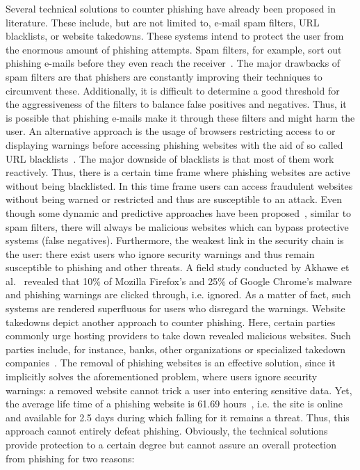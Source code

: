 Several technical solutions to counter phishing have already been proposed in literature.
These include, but are not limited to, e-mail spam filters, URL blacklists, or website takedowns.
These systems intend to protect the user from the enormous amount of phishing attempts. 
Spam filters, for example, sort out phishing e-mails before they even reach the receiver~\cite{bergholz2010new,chandrasekaran2006phishing,fette2007learning}.
The major drawbacks of spam filters are that phishers are constantly improving their techniques to circumvent these. Additionally, it is difficult to determine a good threshold for the aggressiveness of the filters to balance false positives and negatives. 
Thus, it is possible that phishing e-mails make it through these filters and might harm the user.
An alternative approach is the usage of browsers restricting access to or displaying warnings before accessing phishing websites with the aid of so called URL blacklists~\cite{ma2009beyond, zhang2008highly}.
The major downside of blacklists is that most of them work reactively.
Thus, there is a certain time frame where phishing websites are active without being blacklisted.
In this time frame users can access fraudulent websites without being warned or restricted and thus are susceptible to an attack.
Even though some dynamic and predictive approaches have been proposed~\cite{prakash2010phishnet, obied2009fraudulent, balzarotti2012proactive}, similar to spam filters, there will always be malicious websites which can bypass protective systems (false negatives).
 Furthermore, the weakest link in the security chain is the user: there exist users who ignore security warnings and thus remain susceptible to phishing and other threats.
A field study conducted by Akhawe et al.~\cite{akhawe2013alice} revealed that 10\% of Mozilla Firefox's and 25\% of Google Chrome's malware and phishing warnings are clicked through, i.e. ignored.
 As a matter of fact, such systems are rendered superfluous for users who disregard the warnings.
Website takedowns depict another approach to counter phishing. Here, certain parties commonly urge hosting providers to take down revealed malicious websites.
Such parties include, for instance, banks, other organizations or specialized takedown companies~\cite{moore2007examining}.
 The removal of phishing websites is an effective solution, since it implicitly solves the aforementioned problem, where users ignore security warnings: a removed website cannot trick a user into entering sensitive data.
Yet, the average life time of a phishing website is 61.69 hours~\cite{moore2007examining}, i.e. the site is online and available for 2.5 days during which falling for it remains a threat.
Thus, this approach cannot entirely defeat phishing. 
Obviously, the technical solutions provide protection to a certain degree but cannot assure an overall protection from phishing for two reasons:

